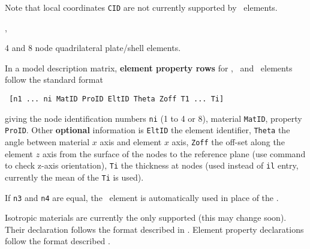 Note that local coordinates {\tt CID} are not currently supported by \massb\ elements.


\femesh, \feplot

\begin{OPENFEM}


\end{OPENFEM}
\begin{SDT}


\end{SDT}


4 and 8 node quadrilateral plate/shell elements.



In a model description matrix, {\bf element property rows} for \quada, \quadb\ and \quadc\ elements follow the standard format

\begin{verbatim}
 [n1 ... ni MatID ProID EltID Theta Zoff T1 ... Ti] 
\end{verbatim}


giving the node identification numbers {\tt ni} (1 to 4 or 8), material {\tt MatID}, property {\tt ProID}. Other {\bf optional} information is {\tt EltID} the element identifier, {\tt Theta} the angle between material $x$ axis and element $x$ axis, {\tt Zoff} the off-set along the element $z$ axis from the surface of the nodes to the reference plane (use  command to check z-axis orientation), {\tt Ti} the thickness at nodes (used instead of {\tt il} entry, currently the mean of the {\tt Ti} is used). \par

If {\tt n3} and {\tt n4} are equal, the \triaa\ element is automatically used in place of the \quada.

Isotropic materials are currently the only supported (this may change soon). Their declaration follows the format described in \melastic.
Element property declarations follow the format described \pshell.


